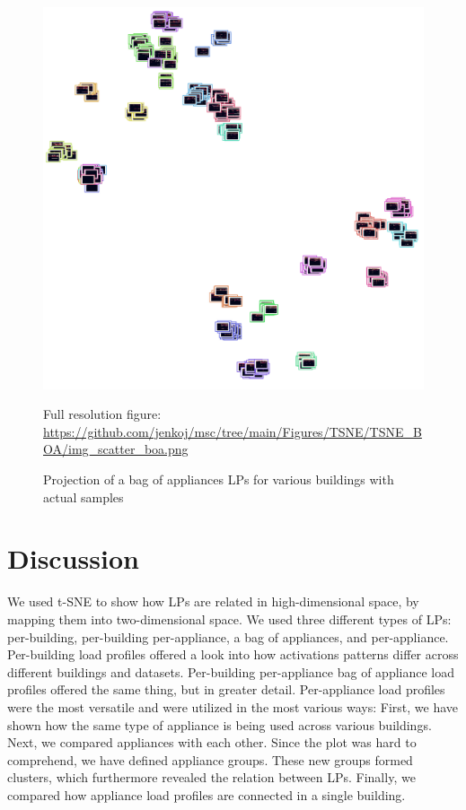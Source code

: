 \begin{figure}[H]
	\centering
	\caption{Projection of a bag of appliances LPs for various buildings with actual samples}
	\includegraphics[width=.9\textwidth]{Figures/TSNE/TSNE_BOA/img_scatter_boa.png}
	\label{fig:tsne_boa_img_scatter_refit8}
	\par
	\par\footnotesize{Full resolution figure: \url{https://github.com/jenkoj/msc/tree/main/Figures/TSNE/TSNE_BOA/img_scatter_boa.png}}
\end{figure}

\section{Discussion}

We used t-SNE to show how LPs are related in high-dimensional space, by mapping them into two-dimensional space.
We used three different types of LPs: per-building, per-building per-appliance, a bag of appliances, and per-appliance.
Per-building load profiles offered a look into how activations patterns differ across different buildings and datasets.
Per-building per-appliance bag of appliance load profiles offered the same thing, but in greater detail.
Per-appliance load profiles were the most versatile and were utilized in the most various ways:
First, we have shown how the same type of appliance is being used across various buildings.
Next, we compared appliances with each other. 
Since the plot was hard to comprehend, we have defined appliance groups.
These new groups formed clusters, which furthermore revealed the relation between LPs. 
Finally, we compared how appliance load profiles are connected in a single building. 

